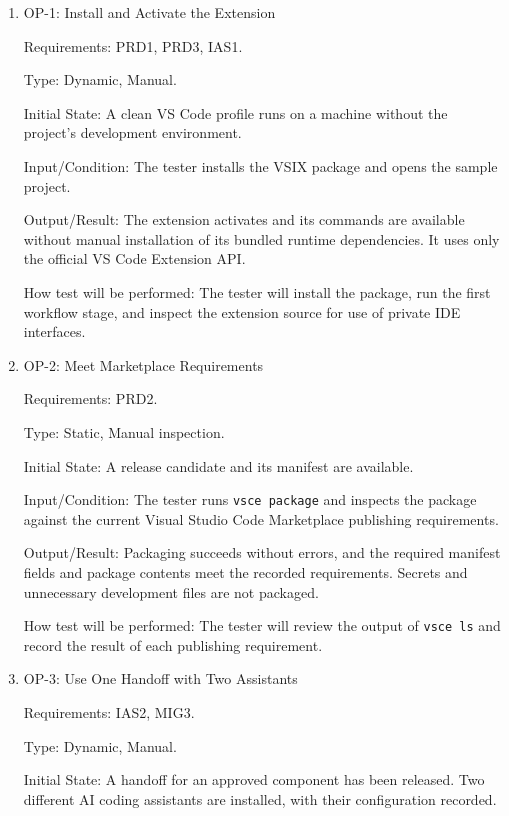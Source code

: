 \documentclass[12pt, titlepage]{article}
\begin{document}
\begin{enumerate}

\item{OP-1: Install and Activate the Extension\\}

Requirements: PRD1, PRD3, IAS1.

Type: Dynamic, Manual.

Initial State: A clean VS Code profile runs on a machine without the project's
development environment.

Input/Condition: The tester installs the VSIX package and opens the sample
project.

Output/Result: The extension activates and its commands are available without
manual installation of its bundled runtime dependencies. It uses only the
official VS Code Extension API.

How test will be performed: The tester will install the package, run the first
workflow stage, and inspect the extension source for use of private IDE
interfaces.

\item{OP-2: Meet Marketplace Requirements\\}

Requirements: PRD2.

Type: Static, Manual inspection.

Initial State: A release candidate and its manifest are available.

Input/Condition: The tester runs \texttt{vsce package} and inspects the package
against the current Visual Studio Code Marketplace publishing requirements.

Output/Result: Packaging succeeds without errors, and the required manifest
fields and package contents meet the recorded requirements. Secrets and
unnecessary development files are not packaged.

How test will be performed: The tester will review the output of \texttt{vsce ls}
and record the result of each publishing requirement.

\item{OP-3: Use One Handoff with Two Assistants\\}

Requirements: IAS2, MIG3.

Type: Dynamic, Manual.

Initial State: A handoff for an approved component has been released. Two
different AI coding assistants are installed, with their configuration
recorded.


\end{enumerate}
\end{document}
